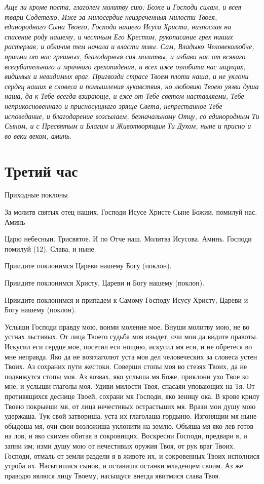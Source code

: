 \itshape Аще ли кроме поста, глаголем молитву сию:\normalfont{} Боже и Господи силам, и всея твари Содетелю, Иже за милосердие неизреченныя милости Твоея, единороднаго Сына Твоего, Господа нашего Исуса Христа, низпослав на спасение роду нашему, и честным Его Крестом, рукописание грех наших растерзав, и обличив тем начала и власти тмы. Сам, Владыко Человеколюбче, приими от нас грешных, благодарныя сия молитвы, и избави нас от всякаго всегубительнаго и мрачнаго грехопадения, и всех иже озлобити нас ищущих, видимых и невидимых враг. Пригвозди страсе Твоем плоти наша, и не уклони сердец наших в словеса и помышления лукавствия, но любовию Твоею уязви душа наша, да к Тебе всегда взирающе, и еже от Тебе светом наставляеми, Тебе неприкосновеннаго и присносущнаго зряще Света, непрестанное Тебе исповедание, и благодарение возсылаем, безначальному Отцу, со единородным Ти Сыном, и с Пресвятым и Благим и Животворящим Ти Духом, ныне и присно и во веки веком, аминь.


\section{Третий час}
 


Приходные поклоны 

За молитв святых отец наших, Господи Исусе Христе Сыне Божии, помилуй нас. Аминь 

Царю небесныи. Трисвятое. И по Отче наш. Молитва Исусова. Аминь. Господи помилуй (12). Слава, и ныне. 

Приидите поклонимся Цареви нашему Богу (поклон).

Приидите поклонимся Христу, Цареви и Богу нашему (поклон).

Приидите поклонимся и припадем к Самому Господу Исусу Христу, Цареви и Богу нашему (поклон).




Услыши Господи правду мою, вонми моление мое. Внуши молитву мою, не во устнах льстивых. От лица Твоего судьба моя изыдет, очи мои да видите правоты. Искусил еси сердце мое, посетил еси нощию, искусил мя еси, и не обретеся во мне неправда. Яко да не возглаголют уста моя дел человеческих за словеса устен Твоих. Аз сохраних пути жестоки. Соверши стопы моя во стезях Твоих, да не подвижутся стопы моя. Аз возвах, яко услыша мя Боже, приклони ухо Твое ко мне, и услыши глаголы моя. Удиви милости Твоя, спасаяи уповающих на Тя. От противящихся деснице Твоей, сохрани мя Господи, яко зеницу ока. В крове крилу Твоею покрыеши мя, от лица нечестивых острастьших мя. Врази мои душу мою удержаша. Тук свой затвориша, уста их глаголаша гордыню. Изгонящии мя ныне обыдоша мя, очи свои возложиша уклонити на землю. Объяша мя яко лев готов на лов, и яко скимен обитая в сокровищих. Воскресни Господи, предвари я, и запни им; изми душу мою от нечестивых оружия Твоя, от рук враг Твоих. Господи, отмаль от земли раздели я в животе их, и сокровенных Твоих исполнися утроба их. Насытишася сынов, и оставиша останки младенцем своим. Аз же праводю явлюся лицу Твоему, насыщуся внегда явитмися слава Твоя.


